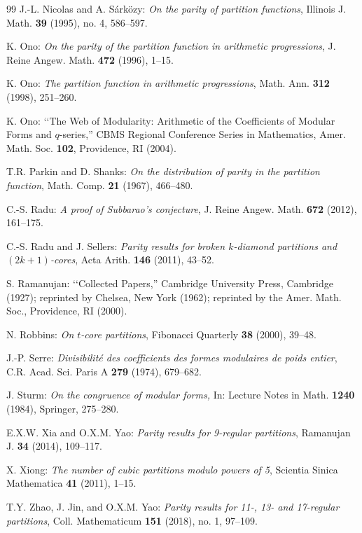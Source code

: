 \documentclass[12pt]{amsart}
\theoremstyle{definition}
\begin{document}
\begin{thebibliography}{99}
 J.-L. Nicolas and A. S\'ark\"ozy: \emph{On the parity of partition functions}, Illinois J. Math. \textbf{39} (1995), no. 4, 586--597.

 K. Ono: \emph{On the parity of the partition function in arithmetic progressions}, J. Reine Angew. Math. \textbf{472} (1996), 1--15.

 K. Ono: \emph{The partition function in arithmetic progressions}, Math. Ann. \textbf{312} (1998), 251--260.

 K. Ono: \lq \lq The Web of Modularity: Arithmetic of the Coefficients of Modular Forms and $q$-series,'' CBMS Regional Conference Series in Mathematics, Amer. Math. Soc. \textbf{102}, Providence, RI (2004).

 T.R. Parkin and D. Shanks: \emph{On the distribution of parity in the partition function}, Math. Comp. \textbf{21} (1967), 466--480.

 C.-S. Radu: \emph{A proof of Subbarao's conjecture}, J. Reine Angew. Math. \textbf{672} (2012), 161--175. %

 C.-S. Radu and J. Sellers: \emph{Parity results for broken $k$-diamond partitions and $(2k+1)$-cores}, Acta Arith. \textbf{146} (2011), 43--52. 

 S. Ramanujan: \lq \lq Collected Papers,'' Cambridge University Press, Cambridge (1927); reprinted by Chelsea, New York (1962); reprinted by the Amer. Math. Soc., Providence, RI (2000).

 N. Robbins: \emph{On $t$-core partitions}, Fibonacci Quarterly \textbf{38} (2000), 39--48.

 J.-P. Serre: \emph{Divisibilit\'{e} des coefficients des formes modulaires de poids entier},  C.R. Acad. Sci. Paris A \textbf{279} (1974), 679--682.

 J. Sturm: \emph{On the congruence of modular forms,} In: Lecture Notes in Math. \textbf{1240}  (1984), Springer, 275--280.

 E.X.W. Xia and O.X.M. Yao: \emph{Parity results for 9-regular partitions}, Ramanujan J. \textbf{34} (2014), 109--117. %

 X. Xiong: \emph{The number of cubic partitions modulo powers of 5}, Scientia Sinica Mathematica \textbf{41} (2011), 1--15. %

 T.Y. Zhao, J. Jin, and O.X.M. Yao: \emph{Parity results for 11-, 13- and 17-regular partitions}, Coll. Mathematicum \textbf{151} (2018), no. 1, 97--109. %

\end{thebibliography}
\end{document}
